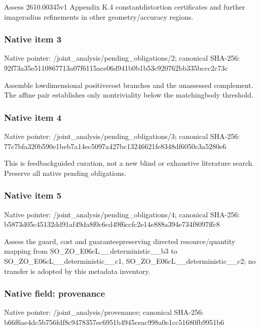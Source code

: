 \documentclass[10pt,a4paper]{article}
\begin{document}
Assess 2610.00345v1 Appendix K.4 constantdistortion certificates and further imageradius refinements in other geometry/accuracy regions.


\subsubsection{Native item 3}


Native pointer: /joint\_analysis/pending\_obligations/2; canonical SHA-256: 92f73a35e5110867713a07f6\allowbreak{}115ace06d941b0b1b53c9207\allowbreak{}62bb335bccc2c73c


Assemble lowdimensional positivecost branches and the unassessed complement. The affine pair establishes only nontriviality below the matchingbody threshold.


\subsubsection{Native item 4}


Native pointer: /joint\_analysis/pending\_obligations/3; canonical SHA-256: 77c7bfa320b590e1beb7a14e\allowbreak{}c5097a427bc13246621fe834\allowbreak{}8df6050c3a5280e6


This is feedbackguided curation, not a new blind or exhaustive literature search. Preserve all native pending obligations.


\subsubsection{Native item 5}


Native pointer: /joint\_analysis/pending\_obligations/4; canonical SHA-256: b5873d05c45132dd91af49da\allowbreak{}8f0c6cd49f6ccfc2e14e888a\allowbreak{}394e734f8097ffc8


Assess the guard, cost and guaranteepreserving directed resource/quantity mapping from SO\_ZO\_E06cL\_\_deterministic\_\_b3 to SO\_ZO\_E06cL\_\_deterministic\_\_c1, SO\_ZO\_E06cL\_\_deterministic\_\_c2; no transfer is adopted by this metadata inventory.


\subsubsection{Native field: provenance}


Native pointer: /joint\_analysis/provenance; canonical SHA-256: b66f6ae4dc5b756fdf8c9478\allowbreak{}357ec6951b4945ceac998a0e\allowbreak{}1cc51680fb9951b6
\end{document}
